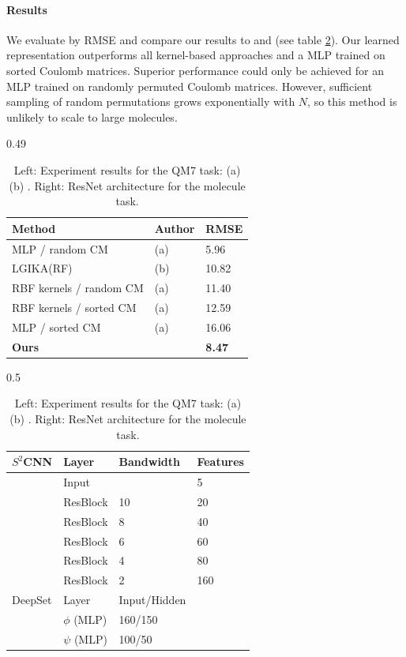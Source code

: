 \documentclass{article} %
\begin{document}
\paragraph{Results}

We evaluate by RMSE and compare our results to \cite{montavon2012nips} and \cite{raj2016local} (see table \ref{tab:molecule_results_and_architecture}). Our learned representation outperforms all kernel-based approaches and a MLP trained on sorted Coulomb matrices. Superior performance could only be achieved for an MLP trained on randomly permuted Coulomb matrices. However, sufficient sampling of random permutations grows exponentially with $N$, so this method is unlikely to scale to large molecules.

\begin{table}
\centering
\begin{subtable}[t]{0.49\textwidth}
    \centering
    \vspace{0pt}
    \begin{tabularx}{\textwidth}{Xll}
       Method  & Author         & RMSE  \\ \hline
       MLP / random CM & (a)  & 5.96 \\
       LGIKA(RF) & (b)   & 10.82 \\ %
       RBF kernels / random CM & (a) & 11.40 \\ %
       RBF kernels / sorted CM& (a) & 12.59 \\
       MLP / sorted CM& (a) & 16.06 \\
       \hline
       \textbf{Ours} & &\textbf{8.47}
    \end{tabularx}
\end{subtable}
\begin{subtable}[t]{0.5\textwidth}
    \centering
    \vspace{0pt}
    \begin{tabularx}{\textwidth}{llll}
        $S^2$CNN & Layer & Bandwidth & Features \\ \hline
        & Input &  & 5 \\
        & ResBlock & 10 & 20 \\
        & ResBlock & 8 & 40 \\
        & ResBlock & 6 & 60 \\
        & ResBlock & 4 & 80 \\
        & ResBlock & 2 & 160 \\
        \hline
        DeepSet & Layer & Input/Hidden \\\hline
        & $\phi$ (MLP) & 160/150 \\
        & $\psi$ (MLP) & 100/50 \\
        \hline
    \end{tabularx}
\end{subtable}
\caption{Left: \label{tab:molecule_results_and_architecture} Experiment results for the QM7 task: (a) \cite{montavon2012nips} (b) \cite{raj2016local}. Right: ResNet architecture for the molecule task.}
\end{table}
\end{document}
